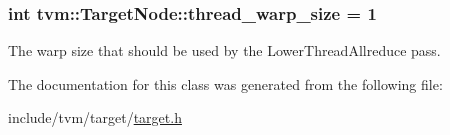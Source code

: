 \subsubsection[{\texorpdfstring{thread\+\_\+warp\+\_\+size}{thread_warp_size}}]{\setlength{\rightskip}{0pt plus 5cm}int tvm\+::\+Target\+Node\+::thread\+\_\+warp\+\_\+size = 1}\hypertarget{classtvm_1_1TargetNode_a4a6adb62a05cc26bd922998ab0b6dfce}{}\label{classtvm_1_1TargetNode_a4a6adb62a05cc26bd922998ab0b6dfce}


The warp size that should be used by the Lower\+Thread\+Allreduce pass. 



The documentation for this class was generated from the following file\+:\begin{DoxyCompactItemize}
\item 
include/tvm/target/\hyperlink{target_8h}{target.\+h}\end{DoxyCompactItemize}
